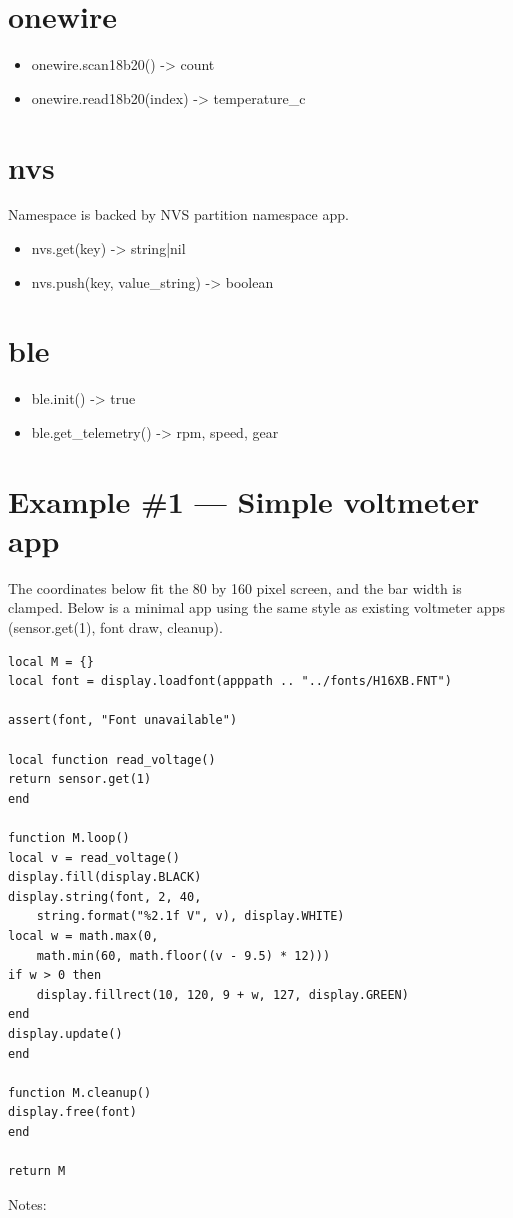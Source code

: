 \section{onewire}
\begin{itemize}
\item onewire.scan18b20() -> count
\item onewire.read18b20(index) -> temperature\_c
\end{itemize}
\section{nvs}
Namespace is backed by NVS partition namespace app.

\begin{itemize}
\item nvs.get(key) -> string|nil
\item nvs.push(key, value\_string) -> boolean
\end{itemize}
\section{ble}
\begin{itemize}
\item ble.init() -> true
\item ble.get\_telemetry() -> rpm, speed, gear
\end{itemize}
\section{Example \#1 — Simple voltmeter app}
The coordinates below fit the 80 by 160 pixel screen, and the bar width is clamped.
Below is a minimal app using the same style as existing voltmeter apps (sensor.get(1), font draw, cleanup).

\begin{verbatim}
local M = {}
local font = display.loadfont(apppath .. "../fonts/H16XB.FNT")

assert(font, "Font unavailable")

local function read_voltage()
return sensor.get(1)
end

function M.loop()
local v = read_voltage()
display.fill(display.BLACK)
display.string(font, 2, 40,
    string.format("%2.1f V", v), display.WHITE)
local w = math.max(0,
    math.min(60, math.floor((v - 9.5) * 12)))
if w > 0 then
    display.fillrect(10, 120, 9 + w, 127, display.GREEN)
end
display.update()
end

function M.cleanup()
display.free(font)
end

return M
\end{verbatim}
Notes:

